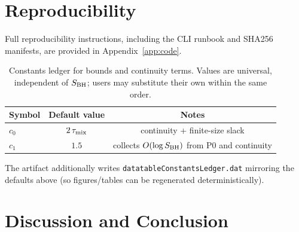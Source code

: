 \documentclass[aps,prd,preprint,onecolumn,superscriptaddress,nofootinbib,longbibliography,floatfix,11pt,showpacs,showkeys]{revtex4-2}
\theoremstyle{plain}
\theoremstyle{definition}
\theoremstyle{remark}
\begin{document}
\section*{Reproducibility}
Full reproducibility instructions, including the CLI runbook and SHA256 manifests, are provided in Appendix~\ref{app:code}.

\begin{table}[t]
\centering
\caption{Constants ledger for bounds and continuity terms.  Values are universal,
independent of $S_{\rm BH}$; users may substitute their own within the same order.}
\label{tab:constants-ledger}
\begin{tabular}{lcc}
\toprule
Symbol & Default value & Notes \\
\midrule
$c_0$ & $2\,\tau_{\rm mix}$ & continuity + finite-size slack \\
$c_1$ & $1.5$               & collects $O(\log S_{\rm BH})$ from P0 and continuity \\
\bottomrule
\end{tabular}
\end{table}

The artifact additionally writes \texttt{datatableConstantsLedger.dat} mirroring
the defaults above (so figures/tables can be regenerated deterministically).

\section{Discussion and Conclusion}
\label{sec:conclusion}
\end{document}
